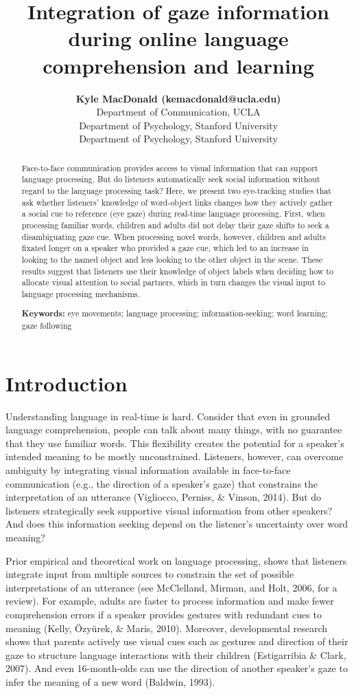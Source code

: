 \documentclass[10pt, letterpaper]{article}
\title{Integration of gaze information during online language\\
comprehension and learning}
\author{{\large \bf Kyle MacDonald (kemacdonald@ucla.edu)} \\ Department of Communication, UCLA  \AND {\large \bf Elizabeth Swanson (elizswan@stanford.edu)} \\ Department of Psychology, Stanford University  \AND {\large \bf Michael C. Frank (mcfrank@stanford.edu)} \\ Department of Psychology, Stanford University  }
\begin{document}
\maketitle

\begin{abstract}
Face-to-face communication provides access to visual information that
can support language processing. But do listeners automatically seek
social information without regard to the language processing task? Here,
we present two eye-tracking studies that ask whether listeners'
knowledge of word-object links changes how they actively gather a social
cue to reference (eye gaze) during real-time language processing. First,
when processing familiar words, children and adults did not delay their
gaze shifts to seek a disambiguating gaze cue. When processing novel
words, however, children and adults fixated longer on a speaker who
provided a gaze cue, which led to an increase in looking to the named
object and less looking to the other object in the scene. These results
suggest that listeners use their knowledge of object labels when
deciding how to allocate visual attention to social partners, which in
turn changes the visual input to language processing mechanisms.

\textbf{Keywords:}
eye movements; language processing; information-seeking; word learning;
gaze following
\end{abstract}

\hypertarget{introduction}{%
\section{Introduction}\label{introduction}}

Understanding language in real-time is hard. Consider that even in
grounded language comprehension, people can talk about many things, with
no guarantee that they use familiar words. This flexibility creates the
potential for a speaker's intended meaning to be mostly unconstrained.
Listeners, however, can overcome ambiguity by integrating visual
information available in face-to-face communication (e.g., the direction
of a speaker's gaze) that constrains the interpretation of an utterance
(Vigliocco, Perniss, \& Vinson, 2014). But do listeners strategically
seek supportive visual information from other speakers? And does this
information seeking depend on the listener's uncertainty over word
meaning?

Prior empirical and theoretical work on language processing, shows that
listeners integrate input from multiple sources to constrain the set of
possible interpretations of an utterance (see McClelland, Mirman, and
Holt, 2006, for a review). For example, adults are faster to process
information and make fewer comprehension errors if a speaker provides
gestures with redundant cues to meaning (Kelly, Özyürek, \& Maris,
2010). Moreover, developmental research shows that parents actively use
visual cues such as gestures and direction of their gaze to structure
language interactions with their children (Estigarribia \& Clark, 2007).
And even 16-month-olds can use the direction of another speaker's gaze
to infer the meaning of a new word (Baldwin, 1993).
\end{document}
